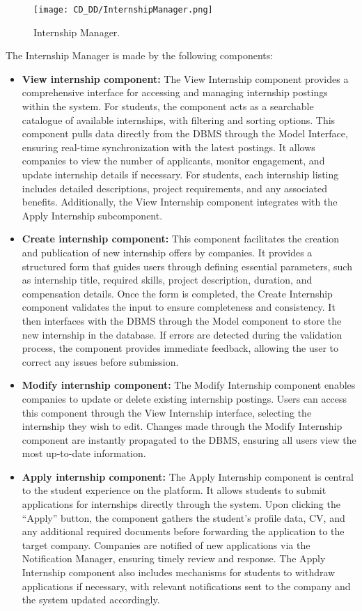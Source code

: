 \begin{figure}[H]
    \begin{center}
        \texttt{[image: CD\_DD/InternshipManager.png]}
        \caption{Internship Manager.}
        \label{fig:internship_manager}%
    \end{center}
\end{figure}

\noindent The Internship Manager is made by the following components:

\begin{itemize}
    \item \textbf{View internship component:} The View Internship component provides a comprehensive interface for accessing and managing internship postings within the system. For students, the component acts as a searchable catalogue of available internships, with filtering and sorting options. This component pulls data directly from the DBMS through the Model Interface, ensuring real-time synchronization with the latest postings. It allows companies to view the number of applicants, monitor engagement, and update internship details if necessary. For students, each internship listing includes detailed descriptions, project requirements, and any associated benefits. Additionally, the View Internship component integrates with the Apply Internship subcomponent.
    \item \textbf{Create internship component:} This component facilitates the creation and publication of new internship offers by companies. It provides a structured form that guides users through defining essential parameters, such as internship title, required skills, project description, duration, and compensation details. Once the form is completed, the Create Internship component validates the input to ensure completeness and consistency. It then interfaces with the DBMS through the Model component to store the new internship in the database. If errors are detected during the validation process, the component provides immediate feedback, allowing the user to correct any issues before submission.
    \item \textbf{Modify internship component:} The Modify Internship component enables companies to update or delete existing internship postings. Users can access this component through the View Internship interface, selecting the internship they wish to edit. Changes made through the Modify Internship component are instantly propagated to the DBMS, ensuring all users view the most up-to-date information. 
    \item \textbf{Apply internship component:} The Apply Internship component is central to the student experience on the platform. It allows students to submit applications for internships directly through the system. Upon clicking the “Apply” button, the component gathers the student’s profile data, CV, and any additional required documents before forwarding the application to the target company. Companies are notified of new applications via the Notification Manager, ensuring timely review and response. The Apply Internship component also includes mechanisms for students to withdraw applications if necessary, with relevant notifications sent to the company and the system updated accordingly.


\end{itemize}
